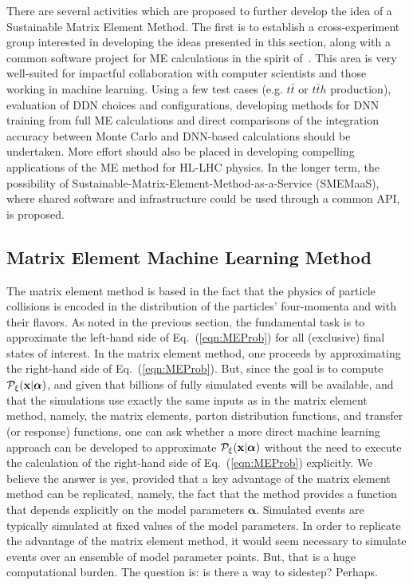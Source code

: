 There are several activities which are proposed to further develop the idea of a Sustainable Matrix Element Method. The first is to establish a cross-experiment group interested in developing the ideas presented in this section, along with a common software project for ME calculations in the spirit of~\cite{MoMEMta}. This area is very well-suited for impactful collaboration with computer scientists and those working in machine learning. Using a few test cases (e.g. $t\bar{t}$ or $t\bar{t}h$ production), evaluation of DDN choices and configurations, developing methods for DNN training from full ME calculations and direct comparisons of the integration accuracy between Monte Carlo and DNN-based calculations should be undertaken. More effort should also be placed in developing compelling applications of the ME method for HL-LHC physics. In the longer term, the possibility of Sustainable-Matrix-Element-Method-as-a-Service (SMEMaaS), where shared software and infrastructure could be used through a common API, is proposed.

\subsection{Matrix Element Machine Learning Method}
The matrix element method is based in the fact that the physics of particle collisions is encoded in the distribution of the particles' four-momenta and with their flavors. As noted in the previous section, the fundamental task is to approximate the left-hand side of Eq.~(\ref{eqn:MEProb}) for all (exclusive) final states of interest. In the matrix element method, one proceeds by approximating the right-hand side of Eq.~(\ref{eqn:MEProb}). But, since the goal is to compute $\mathcal{P}_{\xi}({\bf x}|{\boldsymbol\alpha})$, and given that billions of fully simulated events will be available, and that the simulations use exactly the same inputs as in the matrix element method, namely, the matrix elements, parton distribution functions, and transfer (or response) functions, one can ask whether a more direct machine learning approach can be developed to approximate  $\mathcal{P}_{\xi}({\bf x}|{\boldsymbol\alpha})$ without the need to execute the calculation of the right-hand side of Eq.~(\ref{eqn:MEProb}) explicitly. We believe the answer is yes, provided that a key advantage of the matrix element method can be replicated, namely, the fact that the method provides a function that depends explicitly on the model parameters ${\boldsymbol\alpha}$. Simulated events are typically simulated at fixed values of the model parameters. In order to replicate the advantage of the matrix element method, it would seem necessary to simulate events over an ensemble of model parameter points. But, that is a huge computational burden. The question is: is there a way to sidestep? Perhaps.

